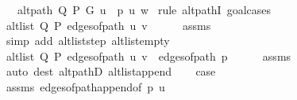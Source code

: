 \begin{isabellebody}
\ \ \ {\isachardoublequoteopen}alt{\isacharunderscore}{\kern0pt}path\ Q\ P\ G\ {\isacharparenleft}{\kern0pt}u\ {\isacharhash}{\kern0pt}\ p{\isacharparenright}{\kern0pt}\ u\ w{\isachardoublequoteclose}\isanewline
%
\isadelimproof
%
\endisadelimproof
%
\isatagproof
{}\isamarkupfalse%
\ {\isacharparenleft}{\kern0pt}rule\ alt{\isacharunderscore}{\kern0pt}pathI{\isacharcomma}{\kern0pt}\ goal{\isacharunderscore}{\kern0pt}cases{\isacharparenright}{\kern0pt}\isanewline
\ \ \isamarkupfalse%
\ {}\isanewline
\ \ \isamarkupfalse%
\ {\isachardoublequoteopen}alt{\isacharunderscore}{\kern0pt}list\ Q\ P\ {\isacharparenleft}{\kern0pt}edges{\isacharunderscore}{\kern0pt}of{\isacharunderscore}{\kern0pt}path\ {\isacharbrackleft}{\kern0pt}u{\isacharcomma}{\kern0pt}\ v{\isacharbrackright}{\kern0pt}{\isacharparenright}{\kern0pt}{\isachardoublequoteclose}\isanewline
\ \ \ \ \isamarkupfalse%
\ assms{\isacharparenleft}{\kern0pt}{}{\isacharparenright}{\kern0pt}\isanewline
\ \ \ \ \isamarkupfalse%
\ {\isacharparenleft}{\kern0pt}simp\ add{\isacharcolon}{\kern0pt}\ alt{\isacharunderscore}{\kern0pt}list{\isacharunderscore}{\kern0pt}step\ alt{\isacharunderscore}{\kern0pt}list{\isacharunderscore}{\kern0pt}empty{\isacharparenright}{\kern0pt}\isanewline
\ \ \isamarkupfalse%
\ {\isachardoublequoteopen}alt{\isacharunderscore}{\kern0pt}list\ Q\ P\ {\isacharparenleft}{\kern0pt}edges{\isacharunderscore}{\kern0pt}of{\isacharunderscore}{\kern0pt}path\ {\isacharbrackleft}{\kern0pt}u{\isacharcomma}{\kern0pt}\ v{\isacharbrackright}{\kern0pt}\ {\isacharat}{\kern0pt}\ edges{\isacharunderscore}{\kern0pt}of{\isacharunderscore}{\kern0pt}path\ p{\isacharparenright}{\kern0pt}{\isachardoublequoteclose}\isanewline
\ \ \ \ \isamarkupfalse%
\ assms{\isacharparenleft}{\kern0pt}{}{\isacharparenright}{\kern0pt}\isanewline
\ \ \ \ \isamarkupfalse%
\ {\isacharparenleft}{\kern0pt}auto\ dest{\isacharcolon}{\kern0pt}\ alt{\isacharunderscore}{\kern0pt}pathD{\isacharparenleft}{\kern0pt}{}{\isacharparenright}{\kern0pt}\ alt{\isacharunderscore}{\kern0pt}list{\isacharunderscore}{\kern0pt}append{\isacharunderscore}{\kern0pt}{}{\isacharparenright}{\kern0pt}\isanewline
\ \ \isamarkupfalse%
\ {\isacharquery}{\kern0pt}case\isanewline
\ \ \ \ \isamarkupfalse%
\ assms{\isacharparenleft}{\kern0pt}{}{\isacharparenright}{\kern0pt}\ edges{\isacharunderscore}{\kern0pt}of{\isacharunderscore}{\kern0pt}path{\isacharunderscore}{\kern0pt}append{\isacharunderscore}{\kern0pt}{}{\isacharbrackleft}{\kern0pt}of\ p\ {\isachardoublequoteopen}{\isacharbrackleft}{\kern0pt}u{\isacharbrackright}{\kern0pt}{\isachardoublequoteclose}{\isacharbrackright}{\kern0pt}\isanewline

\end{isabellebody}
